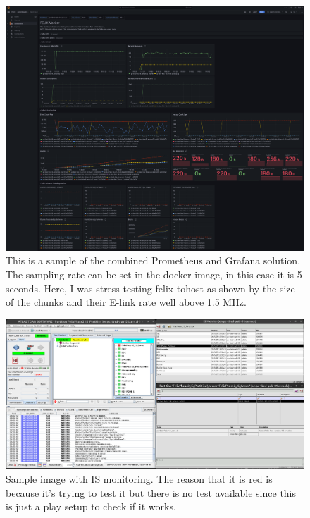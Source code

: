 \begin{figure}
\centering
\includegraphics[width=\textwidth]{images/results/monitoring-merged.png}
\caption[Grafana sample]{This is a sample of the combined Prometheus and Grafana solution. The sampling rate can be set in the docker image, in this case it is 5 seconds. Here, I was stress testing felix-tohost as shown by the size of the chunks and their \acs{E-link} rate well above 1.5 MHz. }
\label{fig:felix-tohost-monitoring}
\end{figure}

\begin{figure}[H]
\centering
\includegraphics[width=\textwidth]{images/results/IS-monitoring.png}
\caption[IS monitoring]{Sample image with IS monitoring. The reason that it is red is because it's trying to test it but there is no test available since this is just a play setup to check if it works.}
\label{fig:felix-tohost-is}
\end{figure}


